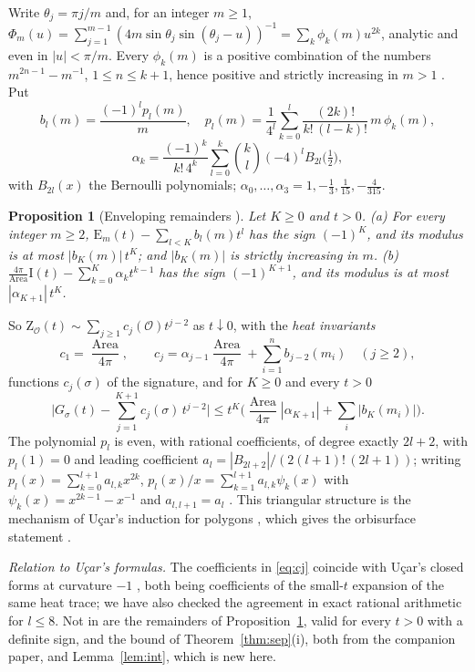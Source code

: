 \documentclass[pdflatex,sn-mathphys-num]{sn-jnl}
\theoremstyle{thmstyleone}%
\newtheorem{proposition}[theorem]{Proposition}%
\theoremstyle{thmstylethree}%
\newcommand{\Orb}{\mathcal{O}}
\newcommand{\Area}{\operatorname{Area}}
\newcommand{\cZ}{\mathrm{Z}}
\begin{document}
Write $\theta_j=\pi j/m$ and, for an integer $m\ge1$, $\Phi_m(u)=\sum_{j=1}^{m-1}(4m\sin\theta_j\sin(\theta_j-u))^{-1}=\sum_k\phi_k(m)u^{2k}$, analytic and even in $|u|<\pi/m$. Every $\phi_k(m)$ is a positive combination of the numbers $m^{2n-1}-m^{-1}$, $1\le n\le k+1$, hence positive and strictly increasing in $m>1$ \cite[Lemma~\ref*{A-lem:Phi}]{companionA}. Put
\[
  b_l(m)=\frac{(-1)^lp_l(m)}m,\quad p_l(m)=\frac1{4^l}\sum_{k=0}^l\frac{(2k)!}{k!\,(l-k)!}\,m\,\phi_k(m),
\]
\[
  \alpha_k=\frac{(-1)^k}{k!\,4^k}\sum_{l=0}^k\binom kl(-4)^lB_{2l}\big(\tfrac12\big),
\]
with $B_{2l}(x)$ the Bernoulli polynomials; $\alpha_0,\dots,\alpha_3=1,-\frac13,\frac1{15},-\frac4{315}$.

\begin{proposition}[Enveloping remainders {\cite[Prop.~\ref*{A-prop:envelope}]{companionA}}]\label{prop:remcone}\label{prop:remarea}
Let $K\ge0$ and $t>0$. (a) For every integer $m\ge2$, $\mathrm E_m(t)-\sum_{l<K}b_l(m)t^l$ has the sign $(-1)^K$, and its modulus is at most $|b_K(m)|\,t^K$; and $|b_K(m)|$ is strictly increasing in $m$. (b) $\frac{4\pi}{\Area}\mathrm I(t)-\sum_{k=0}^K\alpha_kt^{k-1}$ has the sign $(-1)^{K+1}$, and its modulus is at most $|\alpha_{K+1}|\,t^K$.
\end{proposition}

So $\cZ_\Orb(t)\sim\sum_{j\ge1}c_j(\Orb)t^{j-2}$ as $t\downarrow0$, with the \emph{heat invariants}
\begin{equation}\label{eq:cj}
  c_1=\frac{\Area}{4\pi},\qquad c_j=\alpha_{j-1}\frac{\Area}{4\pi}+\sum_{i=1}^nb_{j-2}(m_i)\quad(j\ge2),
\end{equation}
functions $c_j(\sigma)$ of the signature, and for $K\ge0$ and every $t>0$
\begin{equation}\label{eq:Grem}
  \Big|G_\sigma(t)-\sum_{j=1}^{K+1}c_j(\sigma)\,t^{j-2}\Big|\le t^K\Big(\frac{\Area}{4\pi}|\alpha_{K+1}|+\sum_i|b_K(m_i)|\Big).
\end{equation}
The polynomial $p_l$ is even, with rational coefficients, of degree exactly $2l+2$, with $p_l(1)=0$ and leading coefficient $a_l=|B_{2l+2}|/(2(l+1)!\,(2l+1))$; writing $p_l(x)=\sum_{k=0}^{l+1}a_{l,k}x^{2k}$, $p_l(x)/x=\sum_{k=1}^{l+1}a_{l,k}\psi_k(x)$ with $\psi_k(x)=x^{2k-1}-x^{-1}$ and $a_{l,l+1}=a_l$ \cite[Lemmas~\ref*{A-lem:conepoly} and~\ref*{A-lem:triangular}]{companionA}. This triangular structure is the mechanism of U\c{c}ar's induction for polygons \cite[Thm~3.40]{ucar2017}, which gives the orbisurface statement \cite[Cor.~4.21(iv)]{ucar2017}.

\emph{Relation to U\c{c}ar's formulas.} The coefficients in \eqref{eq:cj} coincide with U\c{c}ar's closed forms at curvature $-1$ \cite[Thm~4.20(ii), (4.25), (4.33)--(4.35)]{ucar2017}, both being coefficients of the small-$t$ expansion of the same heat trace; we have also checked the agreement in exact rational arithmetic for $l\le8$. Not in \cite{ucar2017} are the remainders of Proposition~\ref{prop:remcone}, valid for every $t>0$ with a definite sign, and the bound of Theorem~\ref{thm:sep}(i), both from the companion paper, and Lemma~\ref{lem:int}, which is new here.
\end{document}
